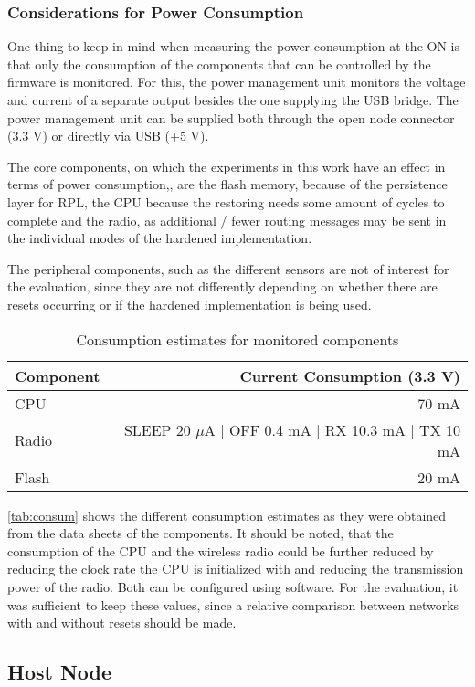\subsubsection{Considerations for Power Consumption}
One thing to keep in mind when measuring the power consumption at the \ac{ON} is
that only the consumption of the components that can be controlled by the
firmware is monitored. For this, the power management unit monitors the voltage
and current of a separate output besides the one supplying the \ac{USB} bridge. The
power management unit can be supplied both through the open node connector (3.3
V) or directly via \ac{USB} (+5 V).

The core components, on which the experiments in this work have an effect in
terms of power consumption,, are the flash memory, because of the persistence
layer for \ac{RPL}, the \ac{CPU} because the restoring needs some amount of
cycles to complete and the radio, as additional / fewer routing messages may be
sent in the individual modes of the hardened implementation.

The peripheral components, such as the different sensors are not of interest for
the evaluation, since they are not differently depending on whether there are
resets occurring or if the hardened implementation is being used.

\begin{table}
  \centering
  \caption{Consumption estimates for monitored components}
  \begin{tabular}{lr}
    \toprule
    Component & Current Consumption (3.3 V) \\
    \midrule
    CPU & 70 mA \\
    Radio & SLEEP 20 $\mu$A | OFF 0.4 mA | RX 10.3 mA | TX 10 mA\\
    Flash & 20 mA 
  \end{tabular}
  \label{tab:consum}
\end{table}

\autoref{tab:consum} shows the different consumption estimates as they were
obtained from the data sheets of the components. It should be noted, that the
consumption of the \ac{CPU} and the wireless radio could be further reduced by
reducing the clock rate the \ac{CPU} is initialized with and reducing the
transmission power of the radio. Both can be configured using software. For the
evaluation, it was sufficient to keep these values, since a relative comparison
between networks with and without resets should be made.

\subsection{Host Node}

